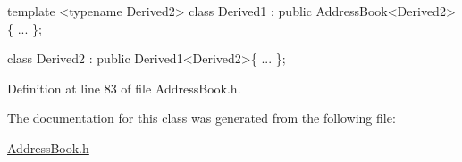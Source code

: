 \begin{DoxyCode}
\textcolor{keyword}{template} <\textcolor{keyword}{typename} Derived2>
\textcolor{keyword}{class }Derived1 : \textcolor{keyword}{public} AddressBook<Derived2>\{
...
\};
 
\textcolor{keyword}{class }Derived2 : \textcolor{keyword}{public} Derived1<Derived2>\{
...
\};
\end{DoxyCode}
 

Definition at line 83 of file Address\+Book.\+h.



The documentation for this class was generated from the following file\+:\begin{DoxyCompactItemize}
\item 
\hyperlink{_address_book_8h}{Address\+Book.\+h}\end{DoxyCompactItemize}
